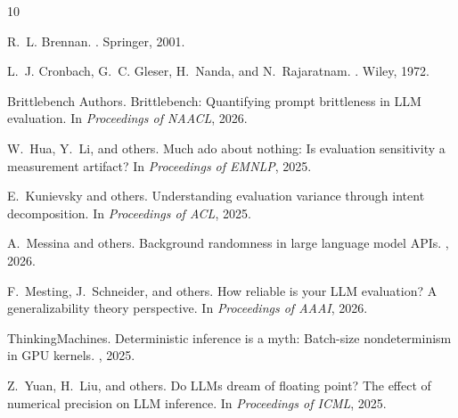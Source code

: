 \documentclass[11pt]{article}
\begin{document}
\begin{thebibliography}{10}

R.~L. Brennan.
.
\newblock Springer, 2001.

L.~J. Cronbach, G.~C. Gleser, H.~Nanda, and N.~Rajaratnam.
.
\newblock Wiley, 1972.

{Brittlebench Authors}.
\newblock Brittlebench: Quantifying prompt brittleness in LLM evaluation.
\newblock In {\em Proceedings of NAACL}, 2026.

W.~Hua, Y.~Li, and others.
\newblock Much ado about nothing: Is evaluation sensitivity a measurement artifact?
\newblock In {\em Proceedings of EMNLP}, 2025.

E.~Kunievsky and others.
\newblock Understanding evaluation variance through intent decomposition.
\newblock In {\em Proceedings of ACL}, 2025.

A.~Messina and others.
\newblock Background randomness in large language model APIs.
, 2026.

F.~Mesting, J.~Schneider, and others.
\newblock How reliable is your LLM evaluation? A generalizability theory perspective.
\newblock In {\em Proceedings of AAAI}, 2026.

{ThinkingMachines}.
\newblock Deterministic inference is a myth: Batch-size nondeterminism in GPU kernels.
, 2025.

Z.~Yuan, H.~Liu, and others.
\newblock Do LLMs dream of floating point? The effect of numerical precision on LLM inference.
\newblock In {\em Proceedings of ICML}, 2025.

\end{thebibliography}
\end{document}
